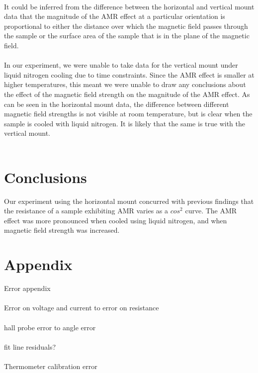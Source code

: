 \documentclass[10pt, twocolumn]{revtex4}
\begin{document}
\\
It could be inferred from the difference between the horizontal and vertical mount data that the magnitude of the AMR effect at a particular orientation is proportional to either the distance over which the magnetic field passes through the sample or the surface area of the sample that is in the plane of the magnetic field. \\
\\
In our experiment, we were unable to take data for the vertical mount under liquid nitrogen cooling due to time constraints. Since the AMR effect is smaller at higher temperatures, this meant we were unable to draw any conclusions about the effect of the magnetic field strength on the magnitude of the AMR effect. As can be seen in the horizontal mount data, the difference between different magnetic field strengths is not visible at room temperature, but is clear when the sample is cooled with liquid nitrogen. It is likely that the same is true with the vertical mount.\\
\\

\section{Conclusions}

Our experiment using the horizontal mount concurred with previous findings that the resistance of a sample exhibiting AMR varies as a $cos^2$ curve. The AMR effect was more pronounced when cooled using liquid nitrogen, and when magnetic field strength was increased.






\newpage


\section{Appendix}

Error appendix\\
\\
Error on voltage and current to error on resistance\\
\\
hall probe error to angle error\\
\\
fit line residuals?\\
\\
Thermometer calibration error\\
\\
\end{document}
